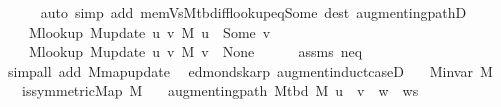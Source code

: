 \begin{isabellebody}
\ \ \ \ \isamarkupfalse%
\ {\isacharparenleft}{\kern0pt}auto\ simp\ add{\isacharcolon}{\kern0pt}\ mem{\isacharunderscore}{\kern0pt}Vs{\isacharunderscore}{\kern0pt}M{\isacharunderscore}{\kern0pt}tbd{\isacharunderscore}{\kern0pt}iff{\isacharunderscore}{\kern0pt}lookup{\isacharunderscore}{\kern0pt}eq{\isacharunderscore}{\kern0pt}Some\ dest{\isacharcolon}{\kern0pt}\ augmenting{\isacharunderscore}{\kern0pt}pathD{\isacharparenleft}{\kern0pt}{}{\isacharcomma}{\kern0pt}\ {}{\isacharparenright}{\kern0pt}{\isacharparenright}{\kern0pt}\isanewline
\ \ \isamarkupfalse%
\isanewline
\ \ \ \ {\isachardoublequoteopen}M{\isacharunderscore}{\kern0pt}lookup\ {\isacharparenleft}{\kern0pt}M{\isacharunderscore}{\kern0pt}update\ u\ v\ M{\isacharparenright}{\kern0pt}\ u\ {\isacharequal}{\kern0pt}\ Some\ v{\isachardoublequoteclose}\isanewline
\ \ \ \ {\isachardoublequoteopen}M{\isacharunderscore}{\kern0pt}lookup\ {\isacharparenleft}{\kern0pt}M{\isacharunderscore}{\kern0pt}update\ u\ v\ M{\isacharparenright}{\kern0pt}\ v\ {\isacharequal}{\kern0pt}\ None{\isachardoublequoteclose}\isanewline
\ \ \ \ \isamarkupfalse%
\ assms{\isacharparenleft}{\kern0pt}{}{\isacharparenright}{\kern0pt}\ neq\isanewline
\ \ \ \ \isamarkupfalse%
\ {\isacharparenleft}{\kern0pt}simp{\isacharunderscore}{\kern0pt}all\ add{\isacharcolon}{\kern0pt}\ M{\isachardot}{\kern0pt}map{\isacharunderscore}{\kern0pt}update{\isacharparenright}{\kern0pt}\isanewline
{}\isamarkupfalse%
%
\endisatagproof
{\isafoldproof}%
%
\isadelimproof
\isanewline
%
\endisadelimproof
%
\isadeliminvisible
\isanewline
%
\endisadeliminvisible
%
\isataginvisible
{}\isamarkupfalse%
\ {\isacharparenleft}{\kern0pt}\ edmonds{\isacharunderscore}{\kern0pt}karp{\isacharparenright}{\kern0pt}\ augment{\isacharunderscore}{\kern0pt}induct{\isacharunderscore}{\kern0pt}case{\isacharunderscore}{\kern0pt}{}D{\isacharcolon}{\kern0pt}\isanewline
\ \ \ {\isachardoublequoteopen}M{\isachardot}{\kern0pt}invar\ M{\isachardoublequoteclose}\isanewline
\ \ \ {\isachardoublequoteopen}is{\isacharunderscore}{\kern0pt}symmetric{\isacharunderscore}{\kern0pt}Map\ M{\isachardoublequoteclose}\isanewline
\ \ \ {\isachardoublequoteopen}augmenting{\isacharunderscore}{\kern0pt}path\ {\isacharparenleft}{\kern0pt}M{\isacharunderscore}{\kern0pt}tbd\ M{\isacharparenright}{\kern0pt}\ {\isacharparenleft}{\kern0pt}u\ {\isacharhash}{\kern0pt}\ v\ {\isacharhash}{\kern0pt}\ w\ {\isacharhash}{\kern0pt}\ ws{\isacharparenright}{\kern0pt}{\isachardoublequoteclose}\isanewline

\end{isabellebody}
